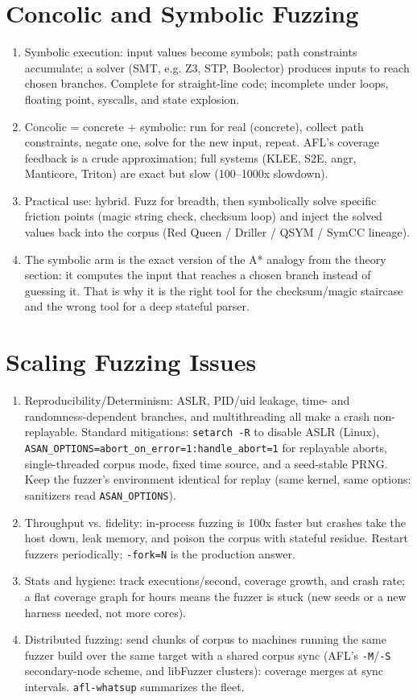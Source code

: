 \documentclass[12pt]{Training}
\begin{document}
\section*{Concolic and Symbolic Fuzzing}
\begin{enumerate}
    \item Symbolic execution: input values become symbols; path constraints accumulate; a solver (SMT, e.g. Z3, STP, Boolector) produces inputs to reach chosen branches. Complete for straight-line code; incomplete under loops, floating point, syscalls, and state explosion.
    \item Concolic = concrete $+$ symbolic: run for real (concrete), collect path constraints, negate one, solve for the new input, repeat. AFL's coverage feedback is a crude approximation; full systems (KLEE, S2E, angr, Manticore, Triton) are exact but slow (100--1000x slowdown).
    \item Practical use: hybrid. Fuzz for breadth, then symbolically solve specific friction points (magic string check, checksum loop) and inject the solved values back into the corpus (Red Queen / Driller / QSYM / SymCC lineage).
    \item The symbolic arm is the exact version of the A* analogy from the theory section: it computes the input that reaches a chosen branch instead of guessing it. That is why it is the right tool for the checksum/magic staircase and the wrong tool for a deep stateful parser.
\end{enumerate}

\section*{Scaling Fuzzing Issues}
\begin{enumerate}
	\item Reproducibility/Determinism: ASLR, PID/uid leakage, time- and randomness-dependent branches, and multithreading all make a crash non-replayable. Standard mitigations: \lstinline{setarch -R} to disable ASLR (Linux), \lstinline{ASAN_OPTIONS=abort_on_error=1:handle_abort=1} for replayable aborts, single-threaded corpus mode, fixed time source, and a seed-stable PRNG. Keep the fuzzer's environment identical for replay (same kernel, same options: sanitizers read \lstinline{ASAN_OPTIONS}).
	\item Throughput vs. fidelity: in-process fuzzing is 100x faster but crashes take the host down, leak memory, and poison the corpus with stateful residue. Restart fuzzers periodically; \lstinline{-fork=N} is the production answer.
	\item Stats and hygiene: track executions/second, coverage growth, and crash rate; a flat coverage graph for hours means the fuzzer is stuck (new seeds or a new harness needed, not more cores).
	\item Distributed fuzzing: send chunks of corpus to machines running the same fuzzer build over the same target with a shared corpus sync (AFL's \lstinline{-M}/\lstinline{-S} secondary-node scheme, and libFuzzer clusters): coverage merges at sync intervals. \lstinline{afl-whatsup} summarizes the fleet.
\end{enumerate}
\end{document}
